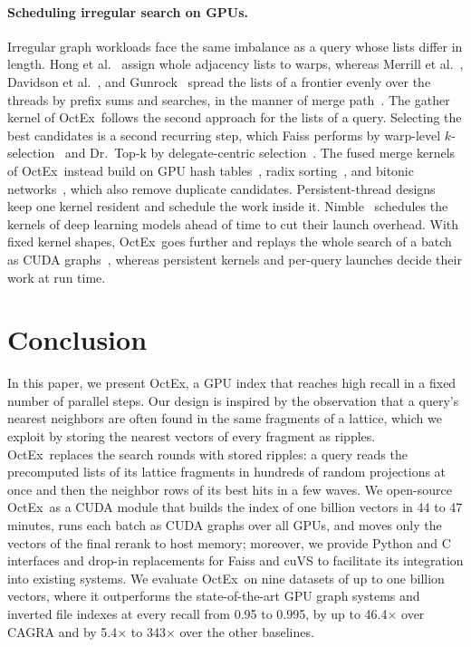 \documentclass[letterpaper,twocolumn,10pt]{article}
\newcommand{\sysname}{OctEx}
\begin{document}
\paragraph{Scheduling irregular search on GPUs.} Irregular graph workloads face the same imbalance as a query whose lists differ in length. Hong et al.~\cite{hong2011warp} assign whole adjacency lists to warps, whereas Merrill et al.~\cite{merrill2012gputraversal}, Davidson et al.~\cite{davidson2014sssp}, and Gunrock~\cite{wang2015gunrock} spread the lists of a frontier evenly over the threads by prefix sums and searches, in the manner of merge path~\cite{green2012mergepath}. The gather kernel of \sysname\ follows the second approach for the lists of a query. Selecting the best candidates is a second recurring step, which Faiss performs by warp-level $k$-selection~\cite{johnson2019faiss} and Dr.~Top-k by delegate-centric selection~\cite{gaihre2021drtopk}. The fused merge kernels of \sysname\ instead build on GPU hash tables~\cite{ashkiani2018hashtable}, radix sorting~\cite{satish2009gpusort,adinets2022onesweep}, and bitonic networks~\cite{batcher1968sorting}, which also remove duplicate candidates. Persistent-thread designs~\cite{gupta2012persistentthreads} keep one kernel resident and schedule the work inside it. Nimble~\cite{kwon2020nimble} schedules the kernels of deep learning models ahead of time to cut their launch overhead. With fixed kernel shapes, \sysname\ goes further and replays the whole search of a batch as CUDA graphs~\cite{nvidia2025cudagraphs}, whereas persistent kernels and per-query launches decide their work at run time.

\section{Conclusion}
\label{sec:conclusion}

In this paper, we present \sysname, a GPU index that reaches high recall in a fixed number of parallel steps.
Our design is inspired by the observation that a query's nearest neighbors are often found in the same fragments of a lattice, which we exploit by storing the nearest vectors of every fragment as ripples.
\sysname\ replaces the search rounds with stored ripples: a query reads the precomputed lists of its lattice fragments in hundreds of random projections at once and then the neighbor rows of its best hits in a few waves. 
We open-source \sysname\ as a CUDA module that builds the index of one billion vectors in 44 to 47 minutes, runs each batch as CUDA graphs over all GPUs, and moves only the vectors of the final rerank to host memory;
moreover, we provide Python and C interfaces and drop-in replacements for Faiss and cuVS to facilitate its integration into existing systems.
We evaluate \sysname\ on nine datasets of up to one billion vectors, where it outperforms the state-of-the-art GPU graph systems and inverted file indexes at every recall from 0.95 to 0.995, by up to 46.4$\times$ over CAGRA and by 5.4$\times$ to 343$\times$ over the other baselines.


{\footnotesize 
}
\end{document}
